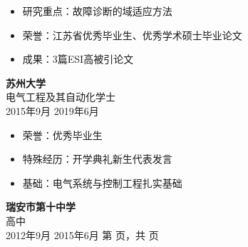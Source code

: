 \documentclass[oneside]{article}
\begin{document}
{\begin{minipage}[t][\dimexpr\textheight-2\fboxrule-2\fboxsep\relax][t]{\dimexpr0.6\textwidth-2\fboxrule-2\fboxsep\relax}
\begin{itemize}
            \item 研究重点：故障诊断的域适应方法
            \item 荣誉：江苏省优秀毕业生、优秀学术硕士毕业论文
            \item 成果：3篇ESI高被引论文
        \end{itemize}
%
        {\large \textbf{苏州大学}}\\
        {{\selectfont 电气工程及其自动化学士}}\\
        {\scshape{}\selectfont\footnotesize 2015年9月 \textendash{} 2019年6月} 
        \begin{itemize}
            \setlength{\itemsep}{-4pt}
            \item 荣誉：优秀毕业生
            \item 特殊经历：开学典礼新生代表发言
            \item 基础：电气系统与控制工程扎实基础
        \end{itemize}
%
        {\large \textbf{瑞安市第十中学}}\\
        {{\selectfont 高中}}\\
        {\scshape{}\selectfont\footnotesize 2012年9月 \textendash{} 2015年6月} 
        \vfill%
        {\hfill\small{}\selectfont 第 \thepage 页，共 \pageref{LastPage} 页\hfill}
    \end{minipage}
}%
\newpage
\end{document}
